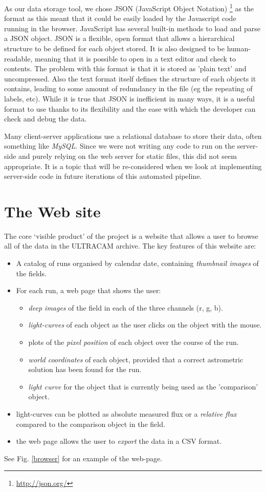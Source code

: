 As our data storage tool, we chose JSON (JavaScript Object Notation) \footnote{\url{http://json.org/}} as the format as this meant that it could be easily loaded by the Javascript code running in the browser. JavaScript has several built-in methods to load and parse a JSON object. JSON is a flexible, open format that allows a hierarchical structure to be defined for each object stored. It is also designed to be human-readable, meaning that it is possible to open in a text editor and check to contents. The problem with this format is that it is stored as 'plain text' and uncompressed. Also the text format itself defines the structure of each objects it contains, leading to some amount of redundancy in the file (eg the repeating of labels, etc). While it is true that JSON is inefficient in many ways, it is a useful format to use thanks to its flexibility and the ease with which the developer can check and debug the data. 

Many client-server applications use a relational database to store their data, often something like \emph{MySQL}. Since we were not writing any code to run on the server-side and purely relying on the web server for static files, this did not seem appropriate. It is a topic that will be re-considered when we look at implementing server-side code in future iterations of this automated pipeline. 

\section{The Web site}
The core `visible product' of the project is a website that allows a user to browse all of the data in the ULTRACAM archive. The key features of this website are:

\begin{itemize}
	\item A catalog of runs organised by calendar date, containing \emph{thumbnail images} of the fields.
	\item For each run, a web page that shows the user:
	\begin{itemize}
		\item \emph{deep images} of the field in each of the three channels (r, g, b).
		\item \emph{light-curves} of each object as the user clicks on the object with the mouse. 
		\item plots of the \emph{pixel position} of each object over the course of the run.
		\item \emph{world coordinates} of each object, provided that a correct astrometric solution has been found for the run. 
		\item \emph{light curve} for the object that is currently being used as the 'comparison' object. 
	\end{itemize}
	\item light-curves can be plotted as absolute measured flux or a \emph{relative flux} compared to the comparison object in the field. 
	\item the web page allows the user to \emph{export} the data in a CSV format.
	
\end{itemize}
See Fig. \ref{browser} for an example of the web-page. 

